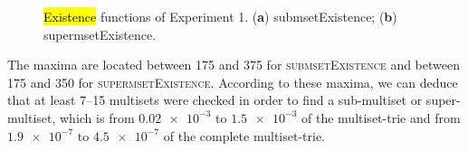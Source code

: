 \documentclass[algorithms,article,accept,pdftex,moreauthors]{Definitions/mdpi}
\begin{document}
\begin{figure}[H]
	\caption{\hl{Existence} %
 functions of Experiment 1. (\textbf{a}) submsetExistence; %
 (\textbf{b}) supermsetExistence.  \label{fig:4}}
\end{figure}

The maxima are located between 175 and 375 for \textsc{submsetExistence} and 
between 175 and 350 for \textsc{supermsetExistence}. According to these maxima,
we can deduce that at least 7--15 multisets were checked in order to find 
a sub-multiset or super-multiset, which is from $\num{0.02e-3}$ to $\num{1.5e-3}$ of the 
multiset-trie and from $\num{1.9e-7}$ to $\num{4.5e-7}$ of the complete 
multiset-trie.
\end{document}
